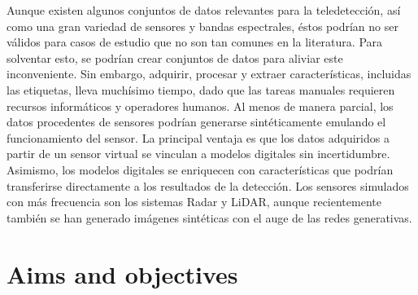 Aunque existen algunos conjuntos de datos relevantes para la teledetección, así como una gran variedad de sensores y bandas espectrales, éstos podrían no ser válidos para casos de estudio que no son tan comunes en la literatura. Para solventar esto, se podrían crear conjuntos de datos para aliviar este inconveniente. Sin embargo, adquirir, procesar y extraer características, incluidas las etiquetas, lleva muchísimo tiempo, dado que las tareas manuales requieren recursos informáticos y operadores humanos. Al menos de manera parcial, los datos procedentes de sensores podrían generarse sintéticamente emulando el funcionamiento del sensor. La principal ventaja es que los datos adquiridos a partir de un sensor virtual se vinculan a modelos digitales sin incertidumbre. Asimismo, los modelos digitales se enriquecen con características que podrían transferirse directamente a los resultados de la detección. Los sensores simulados con más frecuencia son los sistemas Radar y LiDAR, aunque recientemente también se han generado imágenes sintéticas con el auge de las redes generativas.

\section{Aims and objectives}

